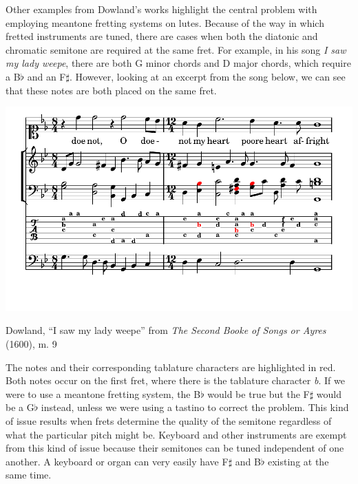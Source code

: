 Other examples from Dowland's works highlight the central problem with employing meantone fretting
systems on lutes. Because of the way in which fretted instruments are tuned, there are cases when
both the diatonic and chromatic semitone are required at the same fret. For example, in his song
\textit{I saw my lady weepe}, there are both G minor chords and D major chords, which require a
B$\flat$ and an F$\sharp$. However, looking at an excerpt from the song below, we can see that
these notes are both placed on the same fret.
\begin{example}[h]
\centering
\includegraphics{examples/saw.pdf}
\label{dowland-saw}
\caption{Dowland, ``I saw my lady weepe'' from \textit{The Second Booke of Songs or Ayres} (1600), m. 9}
\end{example}
The notes and their corresponding tablature characters are highlighted in red. Both
notes occur on the first fret, where there is the tablature character \textit{b}. If
we were to use a meantone fretting system, the B$\flat$ would be true but the F$\sharp$
would be a G$\flat$ instead, unless we were using a tastino to correct the problem.
This kind of issue results when frets determine the quality of the semitone regardless
of what the particular pitch might be. Keyboard and other instruments are exempt from
this kind of issue because their semitones can be tuned independent of one another. A
keyboard or organ can very easily have F$\sharp$ and B$\flat$ existing at the same time.

